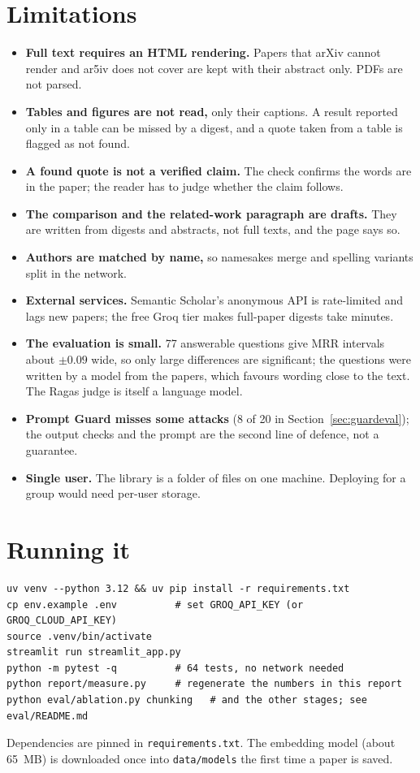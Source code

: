 \documentclass[11pt,a4paper]{article}
\newcommand{\code}[1]{\texttt{#1}}
\begin{document}
\section{Limitations}

\begin{itemize}
\item \textbf{Full text requires an HTML rendering.} Papers that arXiv cannot render and ar5iv does not
  cover are kept with their abstract only. PDFs are not parsed.
\item \textbf{Tables and figures are not read,} only their captions. A result reported only in a table can
  be missed by a digest, and a quote taken from a table is flagged as not found.
\item \textbf{A found quote is not a verified claim.} The check confirms the words are in the paper; the
  reader has to judge whether the claim follows.
\item \textbf{The comparison and the related-work paragraph are drafts.} They are written from digests and
  abstracts, not full texts, and the page says so.
\item \textbf{Authors are matched by name,} so namesakes merge and spelling variants split in the network.
\item \textbf{External services.} Semantic Scholar's anonymous API is rate-limited and lags new papers; the
  free Groq tier makes full-paper digests take minutes.
\item \textbf{The evaluation is small.} 77 answerable questions give MRR intervals about $\pm0.09$ wide, so
  only large differences are significant; the questions were written by a model from the papers, which
  favours wording close to the text. The Ragas judge is itself a language model.
\item \textbf{Prompt Guard misses some attacks} (8 of 20 in Section~\ref{sec:guardeval}); the output checks
  and the prompt are the second line of defence, not a guarantee.
\item \textbf{Single user.} The library is a folder of files on one machine. Deploying for a group would
  need per-user storage.
\end{itemize}

\section{Running it}

\begin{lstlisting}
uv venv --python 3.12 && uv pip install -r requirements.txt
cp env.example .env          # set GROQ_API_KEY (or GROQ_CLOUD_API_KEY)
source .venv/bin/activate
streamlit run streamlit_app.py
python -m pytest -q          # 64 tests, no network needed
python report/measure.py     # regenerate the numbers in this report
python eval/ablation.py chunking   # and the other stages; see eval/README.md
\end{lstlisting}
Dependencies are pinned in \code{requirements.txt}. The embedding model (about 65~MB) is downloaded once into
\code{data/models} the first time a paper is saved.
\end{document}
